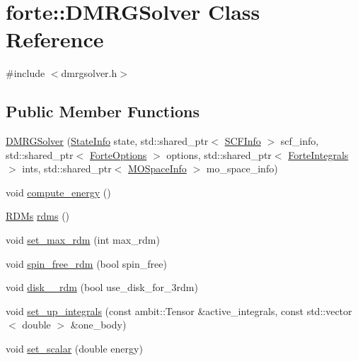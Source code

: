 \hypertarget{classforte_1_1_d_m_r_g_solver}{}\section{forte\+:\+:D\+M\+R\+G\+Solver Class Reference}
\label{classforte_1_1_d_m_r_g_solver}


{\ttfamily \#include $<$dmrgsolver.\+h$>$}

\subsection*{Public Member Functions}
\begin{DoxyCompactItemize}
\item 
\mbox{\hyperlink{classforte_1_1_d_m_r_g_solver_a5ebba6d331bf64c143e9d04e1a8aa1ff}{D\+M\+R\+G\+Solver}} (\mbox{\hyperlink{classforte_1_1_state_info}{State\+Info}} state, std\+::shared\+\_\+ptr$<$ \mbox{\hyperlink{classforte_1_1_s_c_f_info}{S\+C\+F\+Info}} $>$ scf\+\_\+info, std\+::shared\+\_\+ptr$<$ \mbox{\hyperlink{classforte_1_1_forte_options}{Forte\+Options}} $>$ options, std\+::shared\+\_\+ptr$<$ \mbox{\hyperlink{classforte_1_1_forte_integrals}{Forte\+Integrals}} $>$ ints, std\+::shared\+\_\+ptr$<$ \mbox{\hyperlink{classforte_1_1_m_o_space_info}{M\+O\+Space\+Info}} $>$ mo\+\_\+space\+\_\+info)
\item 
void \mbox{\hyperlink{classforte_1_1_d_m_r_g_solver_a814330798182f4bd92f17f6dae68ff84}{compute\+\_\+energy}} ()
\item 
\mbox{\hyperlink{classforte_1_1_r_d_ms}{R\+D\+Ms}} \mbox{\hyperlink{classforte_1_1_d_m_r_g_solver_a6ca5d416d6917bca2b012cc02a0b471e}{rdms}} ()
\item 
void \mbox{\hyperlink{classforte_1_1_d_m_r_g_solver_ad5cc293e3204cb77905758b2688f7275}{set\+\_\+max\+\_\+rdm}} (int max\+\_\+rdm)
\item 
void \mbox{\hyperlink{classforte_1_1_d_m_r_g_solver_a7f34b4aa229850ce78701122f7f20aa0}{spin\+\_\+free\+\_\+rdm}} (bool spin\+\_\+free)
\item 
void \mbox{\hyperlink{classforte_1_1_d_m_r_g_solver_aaec87fefcbd55f4af7aa1bb03cf3a3f8}{disk\+\_\+\_\+rdm}} (bool use\+\_\+disk\+\_\+for\+\_\+3rdm)
\item 
void \mbox{\hyperlink{classforte_1_1_d_m_r_g_solver_a066b17dd1686e43c2de23ae57e6a3a64}{set\+\_\+up\+\_\+integrals}} (const ambit\+::\+Tensor \&active\+\_\+integrals, const std\+::vector$<$ double $>$ \&one\+\_\+body)
\item 
void \mbox{\hyperlink{classforte_1_1_d_m_r_g_solver_aca9ca177f2b8a10c9692eda29d883eec}{set\+\_\+scalar}} (double energy)
\end{DoxyCompactItemize}


